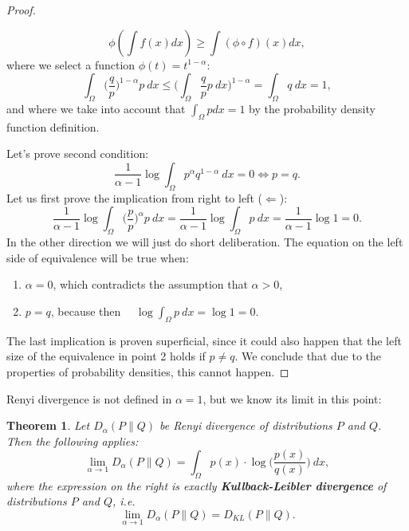 \documentclass[a4paper, 12pt]{article}
\newtheorem{theorem}[lema]{Theorem}
\theoremstyle{definition}
\begin{document}
\begin{proof}
\begin{itemize}
		\begin{equation*}
			\phi(\int f(x) dx) \geq \int (\phi \circ f) (x) dx,
		\end{equation*}
        where we select a function $\phi(t) = t^{1-\alpha}$:
		\begin{equation*}
			\int_\Omega \Big(\frac{q}{p}\Big)^{1-\alpha} p \  dx \leq \Big(\int_\Omega \frac{q}{p} p \ dx\Big)^{1-\alpha} = \int_\Omega q \ dx = 1,
		\end{equation*}
		and where we take into account that $\int_\Omega p dx = 1$ by the probability density function definition.
	\end{itemize}
	Let's prove second condition:
	\begin{equation*}
		\frac{1}{\alpha - 1}\log \int_\Omega p^\alpha q^{1-\alpha} \  dx = 0 \Leftrightarrow p = q.
	\end{equation*}
	Let us first prove the implication from right to left ($\Leftarrow$):
	\begin{equation*}
		\frac{1}{\alpha - 1}\log\int_\Omega \Big(\frac{p}{p}\Big)^\alpha p \  dx = \frac{1}{\alpha - 1}\log\int_\Omega p \  dx = \frac{1}{\alpha - 1}\log 1 = 0.
	\end{equation*}
    In the other direction we will just do short deliberation. The equation on the left side of equivalence will be true when:
	\begin{enumerate}
		\item $\alpha = 0$, which contradicts the assumption that $\alpha > 0$,
		\item $p = q$, because then \ \  $\log\int_\Omega p \ dx = \log 1 = 0$.
	\end{enumerate}
	The last implication is proven superficial, since it could also happen that the left size of the equivalence in point 2 holds if $ p \neq q $. We conclude that due to the properties of probability densities, this cannot happen.
\end{proof}

Renyi divergence is not defined in $\alpha = 1$, but we know its limit in this point:

\begin{theorem}\label{div_v_1}
	Let $D_\alpha(P \| Q)$ be Renyi divergence of distributions $P$ and $Q$. Then the following applies:
	\begin{equation}
		\lim_{\alpha \rightarrow 1} D_\alpha(P \| Q) = \int_\Omega p(x) \cdot \log\Big(\frac{p(x)}{q(x)}\Big) \  dx,
	\end{equation}
	where the expression on the right is exactly \textbf{Kullback-Leibler divergence} of distributions $P$ and $Q$, i.e.
	\begin{equation}
		\lim_{\alpha \rightarrow 1} D_\alpha(P \| Q) = D_{KL} (P \| Q).
	\end{equation}
\end{theorem}
\end{document}

